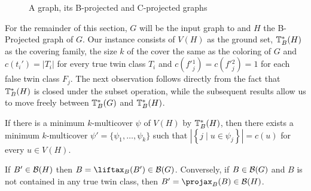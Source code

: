 \begin{figure}[!tb]
    \hfill
    
    
    \caption{A graph, its B-projected and C-projected graphs}
    \label{fig:b-projected}
\end{figure}

For the remainder of this section, $G$ will be the input graph to  and $H$ the B-Projected graph of $G$.
Our  instance consists of $V(H)$ as the ground set, $\mathbb{T}^*_{B}(H)$ as the covering family, the size $k$ of the cover the same as the coloring of $G$ and $c(t_i') = |T_i|$ for every true twin class $T_i$ and $c(f'{_j^1}) = c(f'{_j^2}) = 1$ for each false twin class $F_j$.
The next observation follows directly from the fact that $\mathbb{T}^*_{B}(H)$ is closed under the subset operation, while the subsequent results allow us to move freely between $\mathbb{T}^*_{B}(G)$ and $\mathbb{T}^*_{B}(H)$.

\begin{observation}
    \label{obs:fatless_multicover}
    If there is a minimum $k$-multicover $\psi$ of $V(H)$ by $\mathbb{T}^*_{B}(H)$, then there exists a minimum $k$-multicover $\psi' = \{\psi_1, \dots, \psi_k\}$ such that $\left|\left\{j \mid u \in \psi_j\right\}\right| = c(u)$ for every $u \in V(H)$.
\end{observation}

\begin{lemma}
    \label{lem:lift_proj_biclique}
    If $B' \in \mathcal{B}(H)$ then $B = \Lift{B}(B') \in \biq(G)$. Conversely, if $B \in \mathcal{B}(G)$ and $B$ is not contained in any true twin class, then $B' = \Proj{B}(B) \in \biq(H)$.
\end{lemma}

